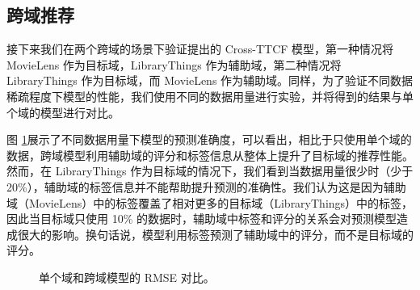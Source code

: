 \subsection{跨域推荐}
接下来我们在两个跨域的场景下验证提出的 Cross-TTCF 模型，第一种情况将 MovieLens 作为目标域，LibraryThings 作为辅助域，第二种情况将 LibraryThings 作为目标域，而 MovieLens 作为辅助域。同样，为了验证不同数据稀疏程度下模型的性能，我们使用不同的数据用量进行实验，并将得到的结果与单个域的模型进行对比。

图 \ref{fig:cross_plot}展示了不同数据用量下模型的预测准确度，可以看出，相比于只使用单个域的数据，跨域模型利用辅助域的评分和标签信息从整体上提升了目标域的推荐性能。
然而，在 LibraryThings 作为目标域的情况下，我们看到当数据用量很少时（少于 20\%），辅助域的标签信息并不能帮助提升预测的准确性。我们认为这是因为辅助域（MovieLens）中的标签覆盖了相对更多的目标域（LibraryThings）中的标签，因此当目标域只使用 10\% 的数据时，辅助域中标签和评分的关系会对预测模型造成很大的影响。换句话说，模型利用标签预测了辅助域中的评分，而不是目标域的评分。
\begin{figure}[!h]
\centering
{}
\caption{单个域和跨域模型的 RMSE 对比。}
\label{fig:cross_plot}
\end{figure}

